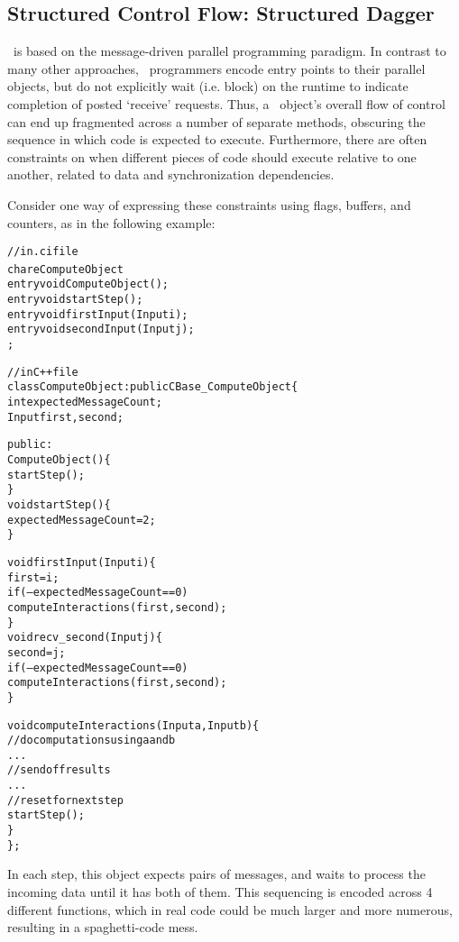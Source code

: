 \subsection{Structured Control Flow: Structured Dagger}
\label{sec:sdag}

\charmpp\ is based on the message-driven parallel programming paradigm. In
contrast to many other approaches, \charmpp\ programmers encode entry points to
their parallel objects, but do not explicitly wait (i.e. block) on the runtime
to indicate completion of posted `receive' requests. Thus, a \charmpp\ object's
overall flow of control can end up fragmented across a number of separate
methods, obscuring the sequence in which code is expected to
execute. Furthermore, there are often constraints on when different pieces of
code should execute relative to one another, related to data and
synchronization dependencies.

Consider one way of expressing these constraints using flags, buffers, and
counters, as in the following example:
%
\begin{center}
\begin{alltt}
// in .ci file
chare ComputeObject {
  entry void ComputeObject();
  entry void startStep();
  entry void firstInput(Input i);
  entry void secondInput(Input j);
};

// in C++ file
class ComputeObject : public CBase_ComputeObject \{
  int   expectedMessageCount;
  Input first, second;

public:
  ComputeObject() \{
    startStep();
  \}
  void startStep() \{
    expectedMessageCount = 2;
  \}

  void firstInput(Input i) \{
    first = i;
    if (--expectedMessageCount == 0)
      computeInteractions(first, second);
    \}
  void recv_second(Input j) \{
    second = j;
    if (--expectedMessageCount == 0)
      computeInteractions(first, second);
  \}

  void computeInteractions(Input a, Input b) \{
    // do computations using a and b
    . . .
    // send off results
    . . .
    // reset for next step
    startStep();
  \}
\};
\end{alltt}
\end{center}
In each step, this object expects pairs of messages, and waits to process the
incoming data until it has both of them. This sequencing is encoded across 4
different functions, which in real code could be much larger and more numerous,
resulting in a spaghetti-code mess.

